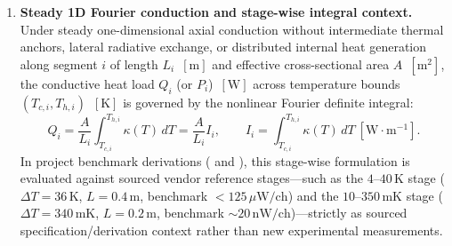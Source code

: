 \documentclass[11pt,a4paper]{article}
\begin{document}
\begin{enumerate}[leftmargin=*]
\item \textbf{Steady 1D Fourier conduction and stage-wise integral context.} Under steady one-dimensional axial conduction without intermediate thermal anchors, lateral radiative exchange, or distributed internal heat generation along segment $i$ of length $L_i$~$[\mathrm{m}]$ and effective cross-sectional area $A$~$[\mathrm{m}^2]$, the conductive heat load $Q_i$ (or $P_i$)~$[\mathrm{W}]$ across temperature bounds $(T_{c,i}, T_{h,i})$~$[\mathrm{K}]$ is governed by the nonlinear Fourier definite integral:
\begin{equation}
Q_i = \frac{A}{L_i}\int_{T_{c,i}}^{T_{h,i}}\kappa(T)\,dT = \frac{A}{L_i}I_i, \qquad I_i = \int_{T_{c,i}}^{T_{h,i}}\kappa(T)\,dT \ \left[\mathrm{W}\cdot\mathrm{m}^{-1}\right].
\end{equation}
In project benchmark derivations ( and ), this stage-wise formulation is evaluated against sourced vendor reference stages---such as the $4\text{--}40\,\mathrm{K}$ stage ($\Delta T=36\,\mathrm{K}$, $L=0.4\,\mathrm{m}$, benchmark $<125\,\mu\mathrm{W/ch}$) and the $10\text{--}350\,\mathrm{mK}$ stage ($\Delta T=340\,\mathrm{mK}$, $L=0.2\,\mathrm{m}$, benchmark $\sim 20\,\mathrm{nW/ch}$)---strictly as sourced specification/derivation context rather than new experimental measurements.


\end{enumerate}
\end{document}
